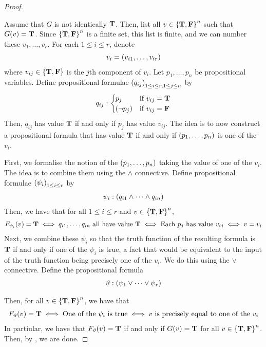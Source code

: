 \begin{proof}
\begin{description}
        Assume that $G$ is not identically $\mathbf{T}$. Then, list all $v \in \left\{ \mathbf{T}, \mathbf{F} \right\}^n$ such that $G(v) = \mathbf{T}$. Since $\left\{ \mathbf{T}, \mathbf{F} \right\}^n$ is a finite set, this list is finite, and we can number these $v_1, \ldots, v_r$. For each $1 \leq i \leq r$, denote
        \begin{align*}
            v_i = \left( v_{i1}, \ldots, v_{ir} \right)
        \end{align*}
        where $v_{ij} \in \left\{ \mathbf{T}, \mathbf{F} \right\}$ is the $j$th component of $v_i$. Let $p_1, \ldots, p_n$ be propositional variables. Define propositional formulae $\left( q_{ij} \right)_{1 \leq i \leq r, 1 \leq j \leq n}$ by
        \begin{align*}
            q_{ij} : \begin{cases}
                p_j & \text{if } v_{ij} = \mathbf{T} \\
                \left( \neg p_j \right) & \text{if } v_{ij} = \mathbf{F}
            \end{cases}
        \end{align*}
        Then, $q_{ij}$ has value $\mathbf{T}$ if and only if $p_j$ has value $v_{ij}$. The idea is to now construct a propositional formula that has value $\mathbf{T}$ if and only if $\left( p_1, \ldots, p_n \right)$ is one of the $v_i$.
        
        First, we formalise the notion of the $\left( p_1, \ldots, p_n \right)$ taking the value of one of the $v_i$. The idea is to combine them using the $\land$ connective. Define propositional formulae $\left( \psi_i \right)_{1 \leq i \leq r}$ by
        \begin{align*}
            \psi_i : \left( q_{i1} \land \cdots \land q_{in} \right)
        \end{align*}
        Then, we have that for all $1 \leq i \leq r$ and $v \in \left\{ \mathbf{T}, \mathbf{F} \right\}^n$,
        \begin{align*}
            F_{\psi_i}(v) = \mathbf{T}
            \iff
            q_{i1}, \ldots, q_{in} \text{ all have value } \mathbf{T}
            \iff
            \text{Each } p_j \text{ has value } v_{ij}
            \iff
            v = v_i
        \end{align*}
        Next, we combine these $\psi_i$ so that the truth function of the resulting formula is $\mathbf{T}$ if and only if one of the $\psi_i$ is true, a fact that would be equivalent to the input of the truth function  being precisely one of the $v_i$. We do this using the $\lor$ connective. Define the propositional formula
        \begin{align*}
            \vartheta : \left( \psi_1 \lor \cdots \lor \psi_r \right)
        \end{align*}
    \end{description}
    Then, for all $v \in \left\{ \mathbf{T}, \mathbf{F} \right\}^n$, we have that
    \begin{align*}
        F_{\vartheta}(v) = \mathbf{T}
        \iff
       \text{One of the } \psi_i \text{ is true}
        \iff
        v \text{ is precisely equal to one of the } v_i
    \end{align*}
    In partiular, we have that $F_{\vartheta}(v) = \mathbf{T}$ if and only if $G(v) = \mathbf{T}$ for all $v \in \left\{ \mathbf{T}, \mathbf{F} \right\}^n$. Then, by , we are done.
\end{proof}

